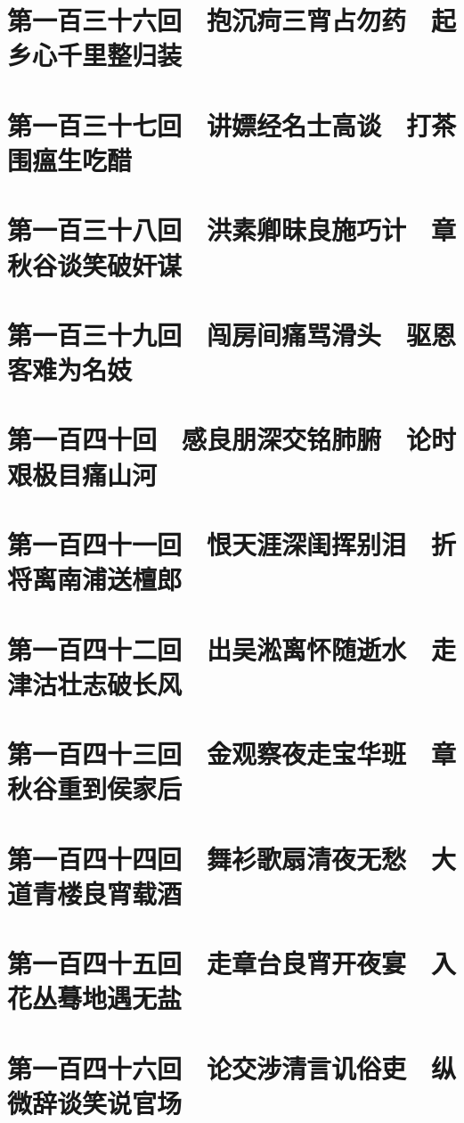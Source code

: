 \documentclass[12pt,UTF8]{ctexbook}
\begin{document}
{\chapter{第一百三十六回　抱沉疴三宵占勿药　起乡心千里整归装}

\chapter{第一百三十七回　讲嫖经名士高谈　打茶围瘟生吃醋}

\chapter{第一百三十八回　洪素卿昧良施巧计　章秋谷谈笑破奸谋}

\chapter{第一百三十九回　闯房间痛骂滑头　驱恩客难为名妓}

\chapter{第一百四十回　感良朋深交铭肺腑　论时艰极目痛山河}
\chapter{第一百四十一回　恨天涯深闺挥别泪　折将离南浦送檀郎}

\chapter{第一百四十二回　出吴淞离怀随逝水　走津沽壮志破长风}

\chapter{第一百四十三回　金观察夜走宝华班　章秋谷重到侯家后}

\chapter{第一百四十四回　舞衫歌扇清夜无愁　大道青楼良宵载酒}

\chapter{第一百四十五回　走章台良宵开夜宴　入花丛蓦地遇无盐}

\chapter{第一百四十六回　论交涉清言讥俗吏　纵微辞谈笑说官场}

}
\end{document}
